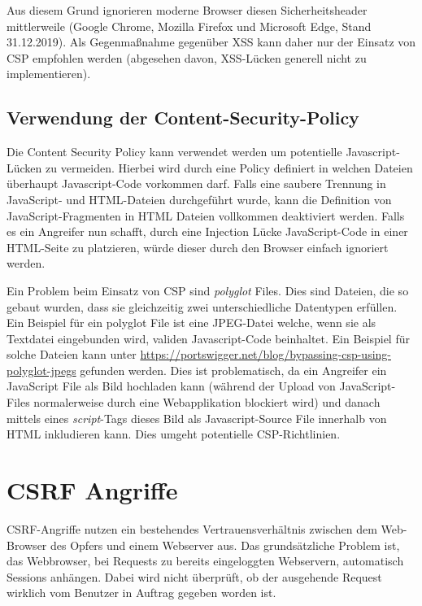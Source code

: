 Aus diesem Grund ignorieren moderne Browser diesen Sicherheitsheader mittlerweile (Google Chrome, Mozilla Firefox und Microsoft Edge, Stand 31.12.2019). Als Gegenmaßnahme gegenüber XSS kann daher nur der Einsatz von CSP empfohlen werden (abgesehen davon, XSS-Lücken generell nicht zu implementieren).

\subsection{Verwendung der Content-Security-Policy}

Die Content Security Policy kann verwendet werden um potentielle Javascript-Lücken zu vermeiden. Hierbei wird durch eine Policy definiert in welchen Dateien überhaupt Javascript-Code vorkommen darf. Falls eine saubere Trennung in JavaScript- und HTML-Dateien durchgeführt wurde, kann die Definition von JavaScript-Fragmenten in HTML Dateien vollkommen deaktiviert werden. Falls es ein Angreifer nun schafft, durch eine Injection Lücke JavaScript-Code in einer HTML-Seite zu platzieren, würde dieser durch den Browser einfach ignoriert werden.

Ein Problem beim Einsatz von CSP sind \textit{polyglot} Files. Dies sind Dateien, die so gebaut wurden, dass sie gleichzeitig zwei unterschiedliche Datentypen erfüllen. Ein Beispiel für ein polyglot File ist eine JPEG-Datei welche, wenn sie als Textdatei eingebunden wird, validen Javascript-Code beinhaltet. Ein Beispiel für solche Dateien kann unter \url{https://portswigger.net/blog/bypassing-csp-using-polyglot-jpegs} gefunden werden. Dies ist problematisch, da ein Angreifer ein JavaScript File als Bild hochladen kann (während der Upload von JavaScript-Files normalerweise durch eine Webapplikation blockiert wird) und danach mittels eines \textit{script}-Tags dieses Bild als Javascript-Source File innerhalb von HTML inkludieren kann. Dies umgeht potentielle CSP-Richtlinien.

\section{CSRF Angriffe}
\label{csrf}

CSRF-Angriffe nutzen ein bestehendes Vertrauensverhältnis zwischen dem Web-Browser des Opfers und einem Webserver aus. Das grundsätzliche Problem ist, das Webbrowser, bei Requests zu bereits eingeloggten Webservern, automatisch Sessions anhängen. Dabei wird nicht überprüft, ob der ausgehende Request wirklich vom Benutzer in Auftrag gegeben worden ist.

